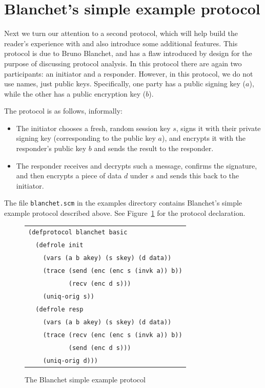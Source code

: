 \section{Blanchet's simple example protocol}
\label{sec:blanchet}

  Next we turn our
attention to a second protocol, which will help build the reader's
experience with {\cpsa} and also introduce some additional features.
This protocol is due to Bruno Blanchet, and has a flaw introduced by
design for the purpose of discussing protocol analysis.  In this
protocol there are again two participants: an initiator and a
responder.  However, in this protocol, we do not use names, just
public keys.  Specifically, one party has a public signing key ($a$),
while the other has a public encryption key ($b$).

The protocol is as follows, informally:

\begin{itemize}

\item The initiator chooses a fresh, random session key $s$, signs it
  with their private signing key (corresponding to the public key
  $a$), and encrypts it with the responder's public key $b$ and sends
  the result to the responder.

\item The responder receives and decrypts such a message, confirms the
  signature, and then encrypts a piece of data $d$ under $s$ and sends
  this back to the initiator.
\end{itemize}

The file \texttt{blanchet.scm} in the examples directory contains
Blanchet's simple example protocol described above.  See
Figure~\ref{fig:blanchet defprotocol} for the protocol declaration.

\begin{figure}
\centering
\begin{tabular}{l}
\verb|(defprotocol blanchet basic|\\
\verb|  (defrole init|\\
\verb|    (vars (a b akey) (s skey) (d data))|\\
\verb|    (trace (send (enc (enc s (invk a)) b))|\\
\verb|           (recv (enc d s)))|\\
\verb|    (uniq-orig s))|\\
\verb|  (defrole resp|\\
\verb|    (vars (a b akey) (s skey) (d data))|\\
\verb|    (trace (recv (enc (enc s (invk a)) b))|\\
\verb|           (send (enc d s)))|\\
\verb|    (uniq-orig d)))|
\end{tabular}
\caption{The Blanchet simple example protocol}
\label{fig:blanchet defprotocol}
\end{figure}

